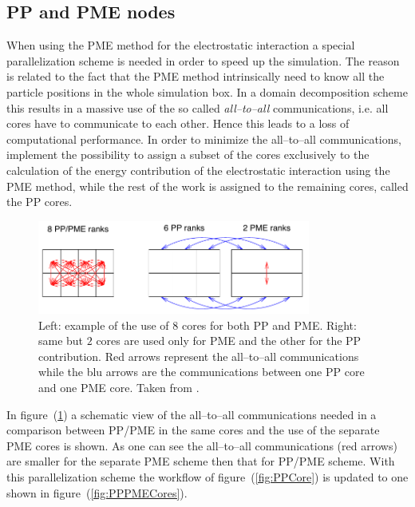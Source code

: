 \subsection{PP and PME nodes}
When using the \ac{PME} method for the electrostatic interaction a special parallelization scheme is needed in order to speed up the simulation. The reason is related to the fact that the \ac{PME} method intrinsically need to know all the particle positions in the whole simulation box. In a domain decomposition scheme this results in a massive use of the so called \textit{all--to--all} communications, i.e. all cores have to communicate to each other. Hence this leads to a loss of computational performance. In order to minimize the all--to--all communications, \gromacs implement the possibility to assign a subset of the cores exclusively to the calculation of the energy contribution of the electrostatic interaction using the \ac{PME} method, while the rest of the work is assigned to the remaining cores, called the \ac{PP} cores. 
\begin{figure}[h!t]
	\centering
	\includegraphics[width=0.8\textwidth]{./img/PMENodes}
	\caption{Left: example of the use of $8$ cores for both \acs{PP} and \acs{PME}. Right: same but $2$ cores are used only for \acs{PME} and the other for the \acs{PP} contribution. Red arrows represent the all--to--all communications while the blu arrows are the communications between one \acs{PP} core and one \acs{PME} core. Taken from \cite{gromacsManual}.}
	\label{fig:PMENodes}
\end{figure} 
In figure~(\ref{fig:PMENodes}) a schematic view of the all--to--all communications needed in a comparison between \ac{PP}/\ac{PME} in the same cores and the use of the separate \ac{PME} cores is shown. As one can see the all--to--all communications (red arrows) are smaller for the separate \acs{PME} scheme then that for \ac{PP}/\ac{PME} scheme. With this parallelization scheme the workflow of figure~(\ref{fig:PPCore}) is updated to one shown in figure~(\ref{fig:PPPMECores}). 
